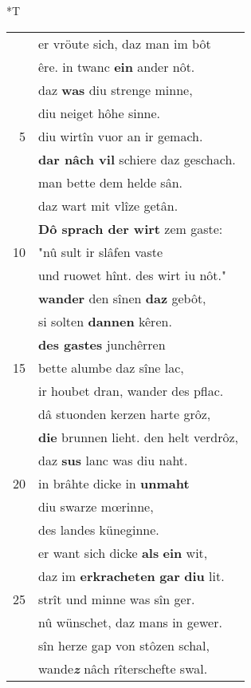 \documentclass[8pt,a4paper,notitlepage]{article}
\begin{document}
\begin{table}[ht]
\begin{minipage}[t]{0.5\linewidth}
\end{minipage}
\hspace{0.5cm}
\begin{minipage}[t]{0.5\linewidth}
\small
\begin{center}*T
\end{center}
\begin{tabular}{rl}
 & er vröute sich, daz man im bôt\\ 
 & êre. in twanc \textbf{ein} ander nôt.\\ 
 & daz \textbf{was} diu strenge minne,\\ 
 & diu neiget hôhe sinne.\\ 
5 & diu wirtîn vuor an ir gemach.\\ 
 & \textbf{dar nâch vil} schiere daz geschach.\\ 
 & man bette dem helde sân.\\ 
 & daz wart mit vlîze getân.\\ 
 & \textbf{Dô sprach der wirt} zem gaste:\\ 
10 & "nû sult ir slâfen vaste\\ 
 & und ruowet hînt. des wirt iu nôt."\\ 
 & \textbf{wander} den sînen \textbf{daz} gebôt,\\ 
 & si solten \textbf{dannen} kêren.\\ 
 & \textbf{des gastes} junchêrren\\ 
15 & bette alumbe daz sîne lac,\\ 
 & ir houbet dran, wander des pflac.\\ 
 & dâ stuonden kerzen harte grôz,\\ 
 & \textbf{die} brunnen lieht. den helt verdrôz,\\ 
 & daz \textbf{sus} lanc was diu naht.\\ 
20 & in brâhte dicke in \textbf{unmaht}\\ 
 & diu swarze mœrinne,\\ 
 & des landes küneginne.\\ 
 & er want sich dicke \textbf{als} \textbf{ein} wit,\\ 
 & daz im \textbf{erkracheten} \textbf{gar} \textbf{diu} lit.\\ 
25 & strît und minne was sîn ger.\\ 
 & nû wünschet, daz mans in gewer.\\ 
 & sîn herze gap von stôzen schal,\\ 
 & wande\textit{\textbf{z}} nâch rîterschefte swal.\\ 

\end{tabular}
\end{minipage}
\end{table}
\end{document}
